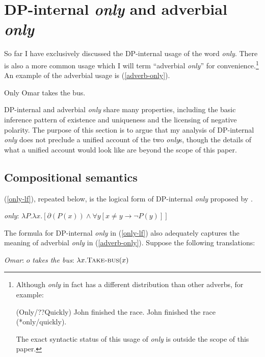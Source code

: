 \section{DP-internal \textit{only} and adverbial \textit{only} \label{sec:two-onlys}}
So far I have exclusively discussed the DP-internal usage of the word \textit{only}. There is also a more common usage which I will term ``adverbial \textit{only}'' for convenience.\footnote{Although \textit{only} in fact has a different distribution than other adverbs, for example: \begin{exe} \ex (Only/??Quickly) John finished the race. \ex John finished the race (*only/quickly). \end{exe} The exact syntactic status of this usage of \textit{only} is outside the scope of this paper.} An example of the adverbial usage is (\ref{adverb-only}).

\begin{exe}
	\ex \label{adverb-only} Only Omar takes the bus.
\end{exe}

DP-internal and adverbial \textit{only} share many properties, including the basic inference pattern of existence and uniqueness and the licensing of negative polarity. The purpose of this section is to argue that my analysis of DP-internal \textit{only} does not preclude a unified account of the two \textit{only}s, though the details of what a unified account would look like are beyond the scope of this paper.

\subsection{Compositional semantics}
(\ref{only-lf}), repeated below, is the logical form of DP-internal \textit{only} proposed by \citet{cb2015}.

\begin{exe}
	 \textit{only}: $ \lambda P . \lambda x . [ \partial(P(x)) \land \forall y [ x \ne y \to \neg P(y) ] ] $
\end{exe}

The formula for DP-internal \textit{only} in (\ref{only-lf}) also adequately captures the meaning of adverbial \textit{only} in (\ref{adverb-only}). Suppose the following translations:

\begin{exe}
	\ex \textit{Omar}: $o$
	\ex \textit{takes the bus}: $\lambda x . \textsc{Take-bus}(x)$
\end{exe}

